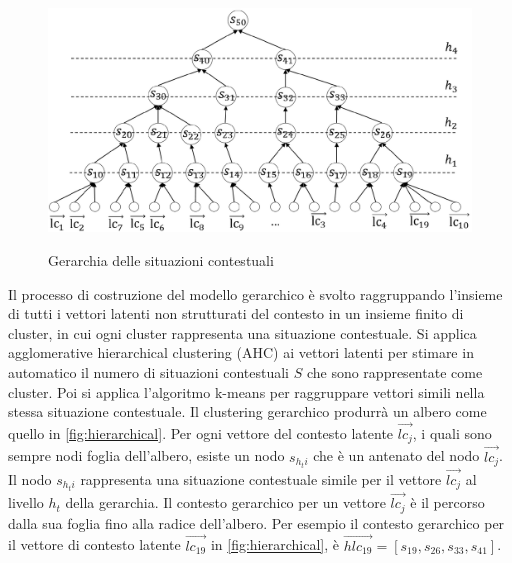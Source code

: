 \begin{figure}
 \centering
  \includegraphics[scale=0.70]{immagini/hierarchical.png}
  \caption{Gerarchia delle situazioni contestuali}
  \label{fig:hierarchical}
  \cite{hierarchical-context}
\end{figure}

Il processo di costruzione del modello gerarchico è svolto raggruppando l'insieme di tutti i vettori latenti non strutturati del contesto in un insieme finito di cluster, in cui ogni cluster rappresenta una situazione contestuale. Si applica agglomerative hierarchical clustering (AHC) \cite{AHC} ai vettori latenti per stimare in automatico il numero di situazioni contestuali $S$ che sono rappresentate come cluster. Poi si applica l'algoritmo k-means  per raggruppare vettori simili nella stessa situazione contestuale. Il clustering gerarchico produrrà un albero come quello in \autoref{fig:hierarchical}. Per ogni vettore del contesto latente $\overrightarrow{lc_j}$, i quali sono sempre nodi foglia dell'albero, esiste un nodo $s_{h_ti}$ che è un antenato del nodo $\overrightarrow{lc_j}$. Il nodo $s_{h_ti}$ rappresenta una situazione contestuale simile per il vettore $\overrightarrow{lc_j}$ al livello $h_t$ della gerarchia. Il contesto gerarchico per un vettore $\overrightarrow{lc_j}$ è il percorso dalla sua foglia fino alla radice dell'albero. Per esempio il contesto gerarchico per il vettore di contesto latente $\overrightarrow{lc_{19}}$ in \autoref{fig:hierarchical}, è $\overrightarrow{hlc_{19}} = [s_{19}, s_{26}, s_{33}, s_{41}]$.

